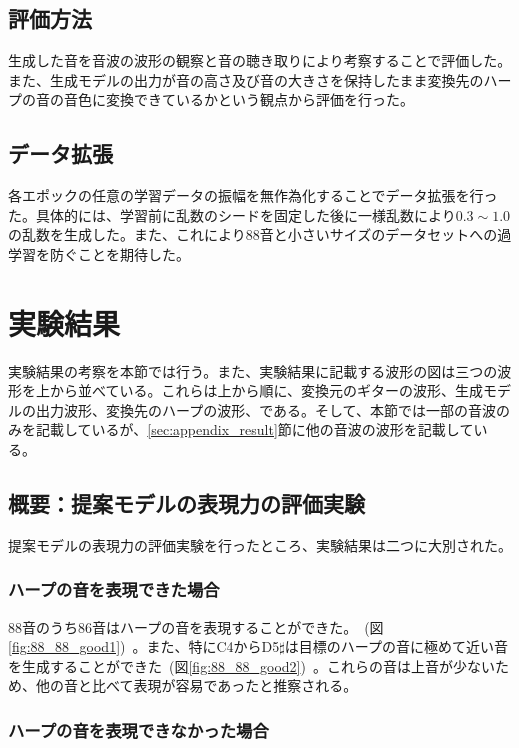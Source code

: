 \clearpage

\subsection{評価方法}

生成した音を音波の波形の観察と音の聴き取りにより考察することで評価した。また、生成モデルの出力が音の高さ及び音の大きさを保持したまま変換先のハープの音の音色に変換できているかという観点から評価を行った。

\subsection{データ拡張}

各エポックの任意の学習データの振幅を無作為化することでデータ拡張を行った。具体的には、学習前に乱数のシードを固定した後に一様乱数により$0.3\sim1.0$の乱数を生成した。また、これにより88音と小さいサイズのデータセットへの過学習を防ぐことを期待した。

\clearpage

\section{実験結果}
\label{result}

実験結果の考察を本節では行う。また、実験結果に記載する波形の図は三つの波形を上から並べている。これらは上から順に、変換元のギターの波形、生成モデルの出力波形、変換先のハープの波形、である。そして、本節では一部の音波のみを記載しているが、\ref{sec:appendix_result}節に他の音波の波形を記載している。

\subsection{概要：提案モデルの表現力の評価実験}

提案モデルの表現力の評価実験を行ったところ、実験結果は二つに大別された。

\subsubsection{ハープの音を表現できた場合}

88音のうち86音はハープの音を表現することができた。~(図\ref{fig:88_88_good1})~。また、特にC4からD5$\sharp$は目標のハープの音に極めて近い音を生成することができた~(図\ref{fig:88_88_good2})~。これらの音は上音が少ないため、他の音と比べて表現が容易であったと推察される。

\subsubsection{ハープの音を表現できなかった場合}

